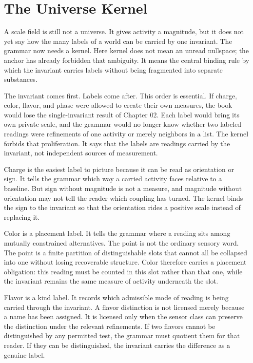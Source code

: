 \section{The Universe Kernel}

A scale field is still not a universe. It gives activity a magnitude, but it
does not yet say how the many labels of a world can be carried by one
invariant. The grammar now needs a kernel. Here kernel does not mean an
unread nullspace; the anchor has already forbidden that ambiguity. It means
the central binding rule by which the invariant carries labels without being
fragmented into separate substances.

The invariant comes first. Labels come after. This order is essential. If
charge, color, flavor, and phase were allowed to create their own measures,
the book would lose the single-invariant result of Chapter 02. Each label
would bring its own private scale, and the grammar would no longer know
whether two labeled readings were refinements of one activity or merely
neighbors in a list. The kernel forbids that proliferation. It says that the
labels are readings carried by the invariant, not independent sources of
measurement.

Charge is the easiest label to picture because it can be read as
orientation or sign. It tells the grammar which way a carried activity faces
relative to a baseline. But sign without magnitude is not a measure, and
magnitude without orientation may not tell the reader which coupling has
turned. The kernel binds the sign to the invariant so that the orientation
rides a positive scale instead of replacing it.

Color is a placement label. It tells the grammar where a reading sits among
mutually constrained alternatives. The point is not the ordinary sensory
word. The point is a finite partition of distinguishable slots that cannot
all be collapsed into one without losing recoverable structure. Color
therefore carries a placement obligation: this reading must be counted in
this slot rather than that one, while the invariant remains the same measure
of activity underneath the slot.

Flavor is a kind label. It records which admissible mode of reading is being
carried through the invariant. A flavor distinction is not licensed merely
because a name has been assigned. It is licensed only when the sensor class
can preserve the distinction under the relevant refinements. If two flavors
cannot be distinguished by any permitted test, the grammar must quotient
them for that reader. If they can be distinguished, the invariant carries
the difference as a genuine label.

